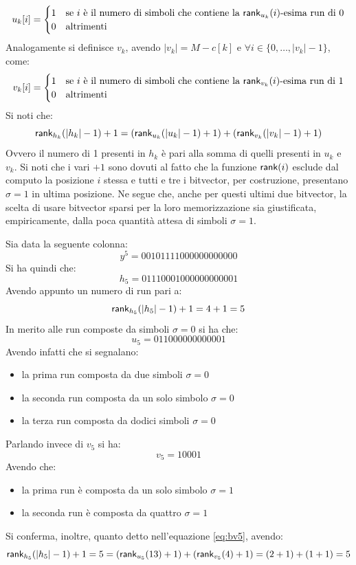 \begin{equation}
  \label{eq:bv3}
  u_k[i]=
  \begin{cases}
    1&\mbox{se }i \mbox{ è il numero di simboli che contiene la
    }\mbox{\rm {\sf rank}}_{u_k}(i)\mbox{-esima run di 0}\\
    0&\mbox{altrimenti}
  \end{cases}
\end{equation}
Analogamente si definisce $v_k$, avendo $|v_k|=M-c[k]$ e $\forall
i\in\{0,\ldots,|v_k|-1\}$, come: 
\begin{equation}
  \label{eq:bv4}
  v_k[i]=
  \begin{cases}
    1&\mbox{se }i \mbox{ è il numero di simboli che contiene la
    }\mbox{\rm {\sf rank}}_{v_k}(i)\mbox{-esima run di 1}\\
    0&\mbox{altrimenti}
  \end{cases}
\end{equation}
Si noti che:
\begin{equation}
  \label{eq:bv5}
  \mbox{\rm {\sf rank}}_{h_k}(|h_k|-1)+1=(\mbox{\rm {\sf rank}}_{u_k}(|u_k|-1)+1)+(\mbox{\rm {\sf rank}}_{v_k}(|v_k|-1)+1)
\end{equation}
Ovvero il numero di 1 presenti in $h_k$ è pari alla somma di quelli presenti in
$u_k$ e $v_k$. Si noti che i vari $+1$ sono
dovuti al fatto che la funzione 
$\mbox{\rm {\sf rank}}(i)$ esclude dal computo la posizione $i$ stessa e tutti e tre i
bitvector, 
per costruzione, presentano $\sigma=1$ in ultima posizione. Ne segue che, anche
per questi ultimi due bitvector, la scelta di 
usare bitvector sparsi per la loro memorizzazione sia giustificata,
empiricamente, dalla poca quantità attesa di simboli $\sigma=1$.
\begin{esempio}
  \label{es:bv1}
  Sia data la seguente colonna:
  \[y^5=00101111000000000000\]
  Si ha quindi che:
  \[h_5=01110001000000000001\]
  Avendo appunto un numero di run pari a:
  \[\mbox{\rm {\sf rank}}_{h_5}(|h_5|-1)+1=4+1=5\]
  In merito alle run composte da simboli $\sigma=0$ si ha che:
  \[u_5=011000000000001\]
  Avendo infatti che si segnalano:
  \begin{itemize}
    \item la prima run composta da due simboli $\sigma=0$
    \item la seconda run composta da un solo simbolo $\sigma=0$
    \item la terza run composta da dodici simboli $\sigma=0$
  \end{itemize}
  Parlando invece di $v_5$ si ha:
  \[v_5=10001\]
  Avendo che:
  \begin{itemize}
    \item la prima run è composta da un solo simbolo $\sigma=1$
    \item la seconda run è composta da quattro $\sigma=1$
  \end{itemize}
  Si conferma, inoltre, quanto detto nell'equazione \ref{eq:bv5}, avendo:
  \[\mbox{\rm {\sf rank}}_{h_5}(|h_5|-1)+1=5 =
    (\mbox{\rm {\sf rank}}_{u_5}(13)+1)+(\mbox{\rm {\sf rank}}_{v_5}(4)+1)=(2+1)+(1+1)=5\] 
\end{esempio}
